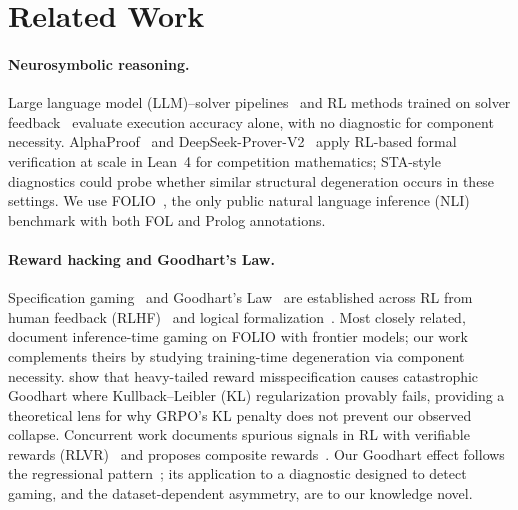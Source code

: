 \section{Related Work}
\label{sec:related-work}

\paragraph{Neurosymbolic reasoning.}
Large language model (LLM)--solver pipelines~\citep{satlm, logic-lm, linc, fover-pei2025, lorp, nlproofs} and RL methods trained on solver feedback~\citep{mellgren-prolog-grpo, logic-rl, deepseek-prover-v15, deepseek-r1, rlsf} evaluate execution accuracy alone, with no diagnostic for component necessity.
AlphaProof~\citep{alphaproof2025} and DeepSeek-Prover-V2~\citep{deepseek-prover-v2} apply RL-based formal verification at scale in Lean~4 for competition mathematics; STA-style diagnostics could probe whether similar structural degeneration occurs in these settings.
We use FOLIO~\citep{folio}, the only public natural language inference (NLI) benchmark with both FOL and Prolog annotations.

\paragraph{Reward hacking and Goodhart's Law.}
Specification gaming~\citep{krakovna2020specification} and Goodhart's Law~\citep{manheim-goodhart-taxonomy, skalse-reward-hacking, karwowski-goodhart-rl} are established across RL from human feedback (RLHF)~\citep{gao-reward-overoptimization} and logical formalization~\citep{bondarenko-spec-gaming, kim-game-formalization}.
Most closely related, \citet{kim-game-formalization} document inference-time gaming on FOLIO with frontier models; our work complements theirs by studying training-time degeneration via component necessity.
\citet{kwa-catastrophic-goodhart} show that heavy-tailed reward misspecification causes catastrophic Goodhart where Kullback--Leibler (KL) regularization provably fails, providing a theoretical lens for why GRPO's KL penalty does not prevent our observed collapse.
Concurrent work documents spurious signals in RL with verifiable rewards (RLVR)~\citep{spurious-rewards, yan2026spurious, dong2026probing, metr-reward-hacking, helff2026gaming, nishimura2026specgaming, khalifa2026countdown} and proposes composite rewards~\citep{tarek2025reward, pronesti2026beyond}.
Our Goodhart effect follows the regressional pattern~\citep{manheim-goodhart-taxonomy}; its application to a diagnostic designed to detect gaming, and the dataset-dependent asymmetry, are to our knowledge novel.

